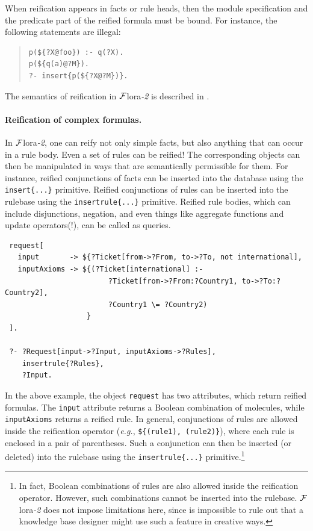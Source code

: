 \documentclass[11pt]{article}
\newcommand{\FLORA}{{\mbox{\sc ${\cal F}${lora}\rm\emph{-2}}}\xspace}
\begin{document}
When reification appears in facts or rule heads, then the module
specification and the predicate part of the reified formula must be bound.
For instance, the following statements are illegal:
\begin{quote}
\begin{verbatim}
p(${?X@foo}) :- q(?X).
p(${q(a)@?M}).
?- insert{p(${?X@?M})}. 
\end{verbatim}
\end{quote}

\noindent
The semantics of reification in \FLORA is described in
\cite{reification-data-semantics-03}.

\paragraph{Reification of complex formulas.}
In \FLORA, one can reify not only simple facts, but also anything that
can occur in a rule body. Even a set of rules can be reified!
The corresponding objects can then be manipulated in ways that are semantically
permissible for them. For instance, reified conjunctions of facts can be
inserted into the database using the \verb|insert{...}| primitive. 
Reified conjunctions of rules can be inserted into the rulebase using the
\verb|insertrule{...}| primitive. Reified rule bodies, which can include
disjunctions, negation, and even things like aggregate functions and update
operators(!), can be called as queries.
\begin{verbatim}
 request[
   input       -> ${?Ticket[from->?From, to->?To, not international],
   inputAxioms -> ${(?Ticket[international] :-
                        ?Ticket[from->?From:?Country1, to->?To:?Country2],
                        ?Country1 \= ?Country2)
                   }
 ].

 ?- ?Request[input->?Input, inputAxioms->?Rules],
    insertrule{?Rules},
    ?Input.
\end{verbatim}

In the above example, the object {\tt request} has two attributes, which
return reified formulas. The {\tt input} attribute returns a Boolean
combination of molecules, while {\tt inputAxioms} returns a reified rule.
In general, conjunctions of rules are allowed inside the reification
operator ({\it e.g.}, \verb|${(rule1), (rule2)}|), where each rule is
enclosed in a pair of parentheses. Such a conjunction can then be inserted
(or deleted) into the rulebase using the {\tt insertrule\{...\}}
primitive.\footnote{
  In fact, Boolean combinations of rules are also allowed inside the
  reification operator. However, such combinations cannot be inserted into
  the rulebase. \FLORA does not impose limitations here, since is
  impossible to rule out that a knowledge base designer might use such a
  feature in creative ways.
}
\end{document}
